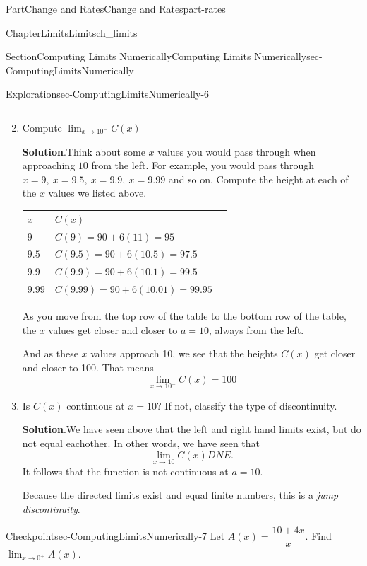 \documentclass{tufte-book}
\newcommand{\blocktitlefont}{\relax}
\newcommand{\tabularfont}{\relax}
\numberwithin{equation}{chapter}
\newcommand{\hrulemedium}{\noalign{\hrule height 0.07em}}
\begin{document}
\begin{partptx}{Part}{Change and Rates}{}{Change and Rates}{}{}{part-rates}
\begin{chapterptx}{Chapter}{Limits}{}{Limits}{}{}{ch_limits}
\begin{sectionptx}{Section}{Computing Limits Numerically}{}{Computing Limits Numerically}{}{}{sec-ComputingLimitsNumerically}
\begin{exploration}{Exploration}{}{sec-ComputingLimitsNumerically-6}
\begin{enumerate}[font=\bfseries,label=(\alph*),ref=\alph*]
\begin{equation*}
\end{equation*}
%
\item{}Compute \(\displaystyle \lim_{x\rightarrow 10^-} C(x)\)%
\par\smallskip%
\noindent\textbf{\blocktitlefont Solution}.\hypertarget{sec-ComputingLimitsNumerically-6-3-2}{}\quad{}Think about some \(x\) values you would pass through when approaching \(10\) from the left. For example, you would pass through \(x=9,\ x=9.5,\ x=9.9,\ x=9.99\) and so on. Compute the height at each of the \(x\) values we listed above. \begin{center}%
{\tabularfont%
\begin{tabular}{lBl}
\(x\)&\(C(x)\)\tabularnewline\hrulemedium
\(9\)&\(C(9) =  90 + 6(11) = 95  \)\tabularnewline\hrulemedium
\(9.5\)&\(C(9.5) = 90 + 6(10.5) = 97.5  \)\tabularnewline\hrulemedium
\(9.9\)&\(C(9.9) =  90 + 6(10.1) =99.5  \)\tabularnewline\hrulemedium
\(9.99\)&\(C(9.99) = 90 + 6(10.01) = 99.95\)
\end{tabular}
}%
\end{center}%
 As you move from the top row of the table to the bottom row of the table, the \(x\) values get closer and closer to \(a=10\), always from the left.%
\par
And as these \(x\) values approach 10, we see that the heights \(C(x)\) get closer and closer to 100.  That means%
\begin{equation*}
\lim_{x\rightarrow 10^-} C(x) = 100
\end{equation*}
%
\item{}Is \(C(x)\) continuous at \(x=10\)?  If not, classify the type of discontinuity.%
\par\smallskip%
\noindent\textbf{\blocktitlefont Solution}.\hypertarget{sec-ComputingLimitsNumerically-6-4-2}{}\quad{}We have seen above that the left and right hand limits exist, but do not equal eachother.  In other words, we have seen that%
\begin{equation*}
\lim_{x\rightarrow 10} C(x) DNE\text{.}
\end{equation*}
It follows that the function is not continuous at \(a=10\).%
\par
Because the directed limits exist and equal finite numbers, this is a \emph{jump discontinuity}.%
\end{enumerate}%
\end{exploration}%
\begin{inlineexercise}{Checkpoint}{}{sec-ComputingLimitsNumerically-7}%
Let \(A(x) = \dfrac{10+4x}{x}\). Find \(\displaystyle\lim_{x\rightarrow 0^+} A(x)\).%

\end{inlineexercise}
\end{sectionptx}
\end{chapterptx}
\end{partptx}
\end{document}

